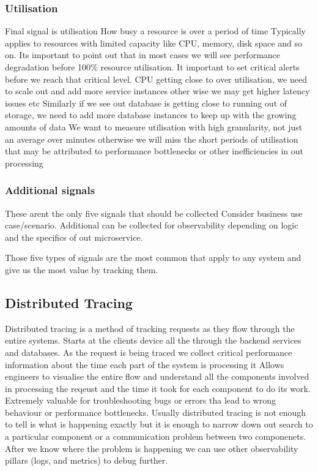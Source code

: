 \documentclass[a4paper, 11pt]{book}
\begin{document}
    \subsubsection{Utilisation}
    Final signal is utilisation
    How busy a resource is over a period of time
    Typically applies to resources with limited capacity like CPU, memory, disk space and so on.
    Its important to point out that in most cases we will see performance degradation before 100\% resource utilisation.
    It important to set critical alerts before we reach that critical level.
    CPU getting close to over utilisation, we need to scale out and add more service instances other wise we may get higher latency issues etc
    Similarly if we see out database is getting close to running out of storage, we need to add more database instances to keep up with the growing amounts of data
    We want to measure utilisation with high granularity, not just an average over minutes otherwise we will miss the short periods of utilisation that may be attributed to performance bottlenecks or other inefficiencies in out processing

    \subsubsection{Additional signals}
    These arent the only five signals that should be collected
    Consider business use case/scenario.
    Additional can be collected for observability depending on logic and the specifics of out microservice.

    Those five types of signals are the most common that apply to any system and give us the most value by tracking them.

    \subsection{Distributed Tracing}
    Distributed tracing is a method of tracking requests as they flow through the entire systems.
    Starts at the clients device all the through the backend services and databases.
    As the request is being traced we collect critical performance information about the time each part of the system is processing it
    Allows engineers to visualise the entire flow and understand all the components involved in processing the reqeust and the time it took for each component to do its work.
    Extremely valuable for troubleshooting bugs or errors tha lead to wrong behaviour or performance bottlenecks.
    Usually distributed tracing is not enough to tell is what is happening exactly but it is enough to narrow down out search to a particular component or a communication problem between two componenets.
    After we know where the problem is happening we can use other observability pillars (logs, and metrics) to debug further.
\end{document}
